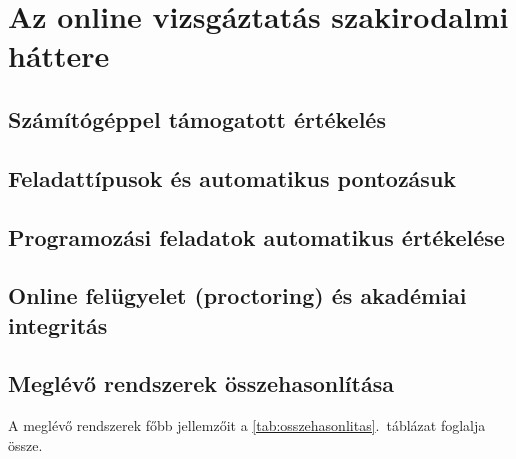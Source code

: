 \chapter{Az online vizsgáztatás szakirodalmi háttere}
\label{ch:szakirodalom}

\section{Számítógéppel támogatott értékelés}

\section{Feladattípusok és automatikus pontozásuk}

\section{Programozási feladatok automatikus értékelése}

\section{Online felügyelet (proctoring) és akadémiai integritás}

\section{Meglévő rendszerek összehasonlítása}
A meglévő rendszerek főbb jellemzőit a \ref{tab:osszehasonlitas}.~táblázat foglalja össze.

